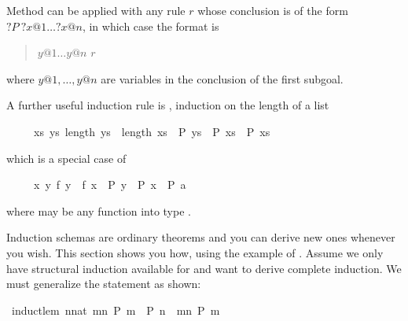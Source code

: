 \begin{isabellebody}
\begin{isamarkuptext}
Method  can be applied with any rule $r$
whose conclusion is of the form ${?}P~?x@1 \dots ?x@n$, in which case the
format is
\begin{quote}
 $y@1 \dots y@n$  $r$\isa{{\isacharparenright}}
\end{quote}
where $y@1, \dots, y@n$ are variables in the conclusion of the first subgoal.

A further useful induction rule is ,
induction on the length of a list
\begin{isabelle}%
\ \ \ \ \ {\isacharparenleft}{\isasymAnd}xs{\isachardot}\ {\isasymforall}ys{\isachardot}\ length\ ys\ {\isacharless}\ length\ xs\ {\isasymlongrightarrow}\ P\ ys\ {\isasymLongrightarrow}\ P\ xs{\isacharparenright}\ {\isasymLongrightarrow}\ P\ xs%
\end{isabelle}
which is a special case of 
\begin{isabelle}%
\ \ \ \ \ {\isacharparenleft}{\isasymAnd}x{\isachardot}\ {\isasymforall}y{\isachardot}\ f\ y\ {\isacharless}\ f\ x\ {\isasymlongrightarrow}\ P\ y\ {\isasymLongrightarrow}\ P\ x{\isacharparenright}\ {\isasymLongrightarrow}\ P\ a%
\end{isabelle}
where  may be any function into type .%
\end{isamarkuptext}%
\isamarkuptrue%
%
\isamarkuptrue%
%
\begin{isamarkuptext}%
\label{sec:derive-ind}
%
Induction schemas are ordinary theorems and you can derive new ones
whenever you wish.  This section shows you how, using the example
of . Assume we only have structural induction
available for  and want to derive complete induction.  We
must generalize the statement as shown:%
\end{isamarkuptext}%
\isamarkuptrue%
\isamarkupfalse%
\ induct{\isacharunderscore}lem{\isacharcolon}\ {\isachardoublequoteopen}{\isacharparenleft}{\isasymAnd}n{\isacharcolon}{\isacharcolon}nat{\isachardot}\ {\isasymforall}m{\isacharless}n{\isachardot}\ P\ m\ {\isasymLongrightarrow}\ P\ n{\isacharparenright}\ {\isasymLongrightarrow}\ {\isasymforall}m{\isacharless}n{\isachardot}\ P\ m{\isachardoublequoteclose}\isanewline
%
\isadelimproof

\end{isabellebody}
